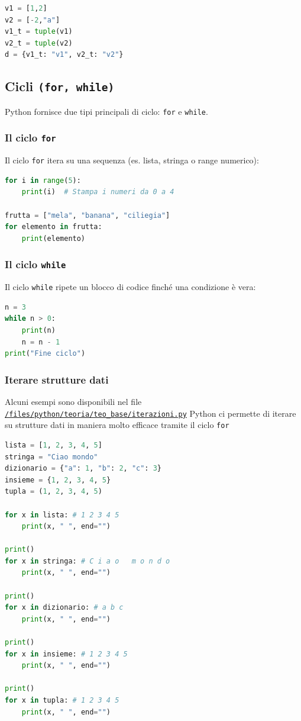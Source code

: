 \begin{lstlisting}[language = python, frame = none]
v1 = [1,2]
v2 = [-2,"a"]
v1_t = tuple(v1)
v2_t = tuple(v2)
d = {v1_t: "v1", v2_t: "v2"}
\end{lstlisting}


\subsection{Cicli  \texttt{(for, while)}} \label{sec:loops}
Python fornisce due tipi principali di ciclo: \texttt{for} e \texttt{while}.

\subsubsection{Il ciclo \texttt{for}}
Il ciclo \texttt{for} itera su una sequenza (es. lista, stringa o range numerico):

\begin{lstlisting}[language = python, frame = none]
for i in range(5):
    print(i)  # Stampa i numeri da 0 a 4

frutta = ["mela", "banana", "ciliegia"]
for elemento in frutta:
    print(elemento)
\end{lstlisting}

\subsubsection{Il ciclo \texttt{while}}
Il ciclo \texttt{while} ripete un blocco di codice finché una condizione è vera:

\begin{lstlisting}[language = python, frame = none]
n = 3
while n > 0:
    print(n)
    n = n - 1
print("Fine ciclo")
\end{lstlisting}

\subsubsection{Iterare strutture dati}
Alcuni esempi sono disponibili nel file \texttt{\href{run:./files/python/teoria/teo_base/}{/files/python/teoria/teo\_base/iterazioni.py}}
\vskip3mm
Python ci permette di iterare su strutture dati in maniera molto efficace tramite il ciclo \verb|for|
\begin{lstlisting}[language = python, frame = none]
lista = [1, 2, 3, 4, 5]
stringa = "Ciao mondo"
dizionario = {"a": 1, "b": 2, "c": 3}
insieme = {1, 2, 3, 4, 5}
tupla = (1, 2, 3, 4, 5)

for x in lista: # 1 2 3 4 5
    print(x, " ", end="")

print()
for x in stringa: # C i a o   m o n d o
    print(x, " ", end="")

print()
for x in dizionario: # a b c
    print(x, " ", end="")

print() 
for x in insieme: # 1 2 3 4 5
    print(x, " ", end="")

print()
for x in tupla: # 1 2 3 4 5
    print(x, " ", end="")
\end{lstlisting}

